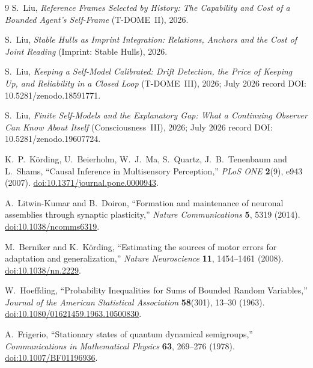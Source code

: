 \documentclass[11pt]{article}
\theoremstyle{definition}
\theoremstyle{remark}
\begin{document}
\begin{thebibliography}{9}
S.~Liu, \emph{Reference Frames Selected by History: The Capability and Cost of a Bounded Agent's Self-Frame}
(T-DOME~II), 2026.

S.~Liu, \emph{Stable Hulls as Imprint Integration: Relations, Anchors and the Cost of Joint Reading}
(Imprint: Stable Hulls), 2026.

S.~Liu, \emph{Keeping a Self-Model Calibrated: Drift Detection, the Price of Keeping Up, and Reliability in a Closed Loop} (T-DOME~III), 2026; July 2026 record DOI: 10.5281/zenodo.18591771.

S.~Liu, \emph{Finite Self-Models and the Explanatory Gap: What a Continuing Observer Can Know About Itself} (Consciousness~III), 2026; July 2026 record DOI: 10.5281/zenodo.19607724.

K.~P.~Körding, U.~Beierholm, W.~J.~Ma, S.~Quartz, J.~B.~Tenenbaum and L.~Shams,
``Causal Inference in Multisensory Perception,''
\emph{PLoS ONE} \textbf{2}(9), e943 (2007).
\href{https://doi.org/10.1371/journal.pone.0000943}{doi:10.1371/journal.pone.0000943}.

A.~Litwin-Kumar and B.~Doiron,
``Formation and maintenance of neuronal assemblies through synaptic plasticity,''
\emph{Nature Communications} \textbf{5}, 5319 (2014).
\href{https://doi.org/10.1038/ncomms6319}{doi:10.1038/ncomms6319}.

M.~Berniker and K.~Körding,
``Estimating the sources of motor errors for adaptation and generalization,''
\emph{Nature Neuroscience} \textbf{11}, 1454--1461 (2008).
\href{https://doi.org/10.1038/nn.2229}{doi:10.1038/nn.2229}.

W.~Hoeffding,
``Probability Inequalities for Sums of Bounded Random Variables,''
\emph{Journal of the American Statistical Association} \textbf{58}(301), 13--30 (1963).
\href{https://doi.org/10.1080/01621459.1963.10500830}{doi:10.1080/01621459.1963.10500830}.

A.~Frigerio,
``Stationary states of quantum dynamical semigroups,''
\emph{Communications in Mathematical Physics} \textbf{63}, 269--276 (1978).
\href{https://doi.org/10.1007/BF01196936}{doi:10.1007/BF01196936}.
\end{thebibliography}
\end{document}
